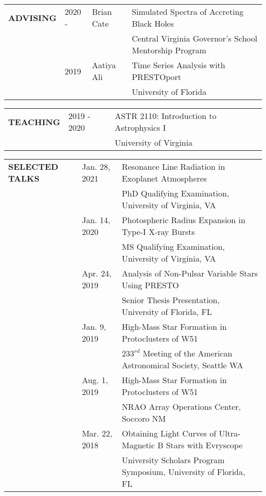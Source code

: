 \documentclass{article}
\begin{document}
\begin{tabular}{p{4cm}p{2.2cm}ll}
    \large{\textbf{ADVISING}} & 2020 - & Brian Cate & Simulated Spectra of Accreting Black Holes\\
     & & & \small Central Virginia Governor's School Mentorship Program \vspace{0.125cm}\\
    & 2019 & Aatiya Ali & Time Series Analysis with PRESTOport \\
     & & & \small University of Florida
\end{tabular}
\vspace{0.5cm}


\begin{tabular}{p{4cm}p{2.2cm}l}
    \large{\textbf{TEACHING}} & 2019 - 2020 & ASTR 2110: Introduction to Astrophysics I \\
     & & University of Virginia
\end{tabular}
\vspace{0.5cm}



\begin{tabular}{p{4cm}p{2.2cm}l}
    \large{\textbf{SELECTED \newline TALKS}}
    &Jan. 28, 2021 & Resonance Line Radiation in Exoplanet Atmospheres \vspace{-0.45cm}\\
    &              & \small PhD Qualifying Examination, University of Virginia, VA  \vspace{0.125cm} \\
    &Jan. 14, 2020 & Photospheric Radius Expansion in Type-I X-ray Bursts \\
    &              & \small MS Qualifying Examination, University of Virginia, VA  \vspace{0.125cm} \\
    &Apr. 24, 2019 & Analysis of Non-Pulsar Variable Stars Using PRESTO \\
    &              & \small Senior Thesis Presentation, University of Florida, FL \vspace{0.125cm} \\ 
    &Jan. 9, 2019 & High-Mass Star Formation in Protoclusters of W51 \\
    &            & \small $233^{rd}$ Meeting of the American Astronomical Society, Seattle WA  \vspace{0.125cm} \\
    &Aug. 1, 2019 & High-Mass Star Formation in Protoclusters of W51 \\
    &             & \small NRAO Array Operations Center, Soccoro NM  \vspace{0.125cm} \\
    &Mar. 22, 2018 & Obtaining Light Curves of Ultra-Magnetic B Stars with Evryscope\\
    &              & \small University Scholars Program Symposium, University of Florida, FL  \vspace{0.125cm} \\
\end{tabular}
\vspace{0.5cm}
\end{document}
